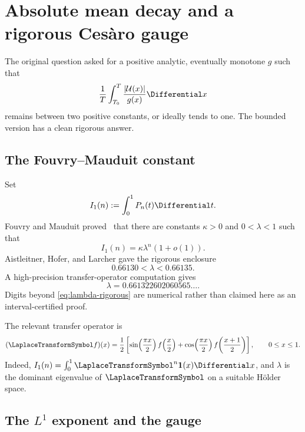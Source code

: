 \documentclass[11pt,oneside]{article}
\theoremstyle{definition}
\theoremstyle{remark}
\newcommand{\Uhat}{\mathcal U}
\begin{document}
\section{Absolute mean decay and a rigorous Ces\`aro gauge}\label{sec:cesaro}

The original question asked for a positive analytic, eventually monotone $g$ such that
\[
 \frac1T\int_{T_0}^{T}\frac{|\Uhat(x)|}{g(x)}\Differential x
\]
remains between two positive constants, or ideally tends to one.  The bounded version
has a clean rigorous answer.

\subsection{The Fouvry--Mauduit constant}

Set
\begin{equation}\label{eq:I1n}
 I_1(n):=\int_0^1P_n(t)\Differential t.
\end{equation}
Fouvry and Mauduit proved~\cite{fouvrymauduit1996} that there are constants
$\kappa>0$ and $0<\lambda<1$ such that
\begin{equation}\label{eq:FM}
 I_1(n)=\kappa\lambda^n(1+o(1)).
\end{equation}
Aistleitner, Hofer, and Larcher gave the rigorous enclosure
\begin{equation}\label{eq:lambda-rigorous}
 0.66130<\lambda<0.66135.
\end{equation}
A high-precision transfer-operator computation gives
\begin{equation}\label{eq:lambda-numeric}
 \lambda=0.661322602060565\ldots .
\end{equation}
Digits beyond \eqref{eq:lambda-rigorous} are numerical rather than claimed here as an
interval-certified proof.

The relevant transfer operator is
\begin{equation}\label{eq:transfer-L1}
 (\LaplaceTransformSymbol f)(x)=\frac12\left[
 \sin\!\left(\frac{\pi x}{2}\right)f\!\left(\frac x2\right)
 +\cos\!\left(\frac{\pi x}{2}\right)f\!\left(\frac{x+1}{2}\right)
 \right],\qquad 0\le x\le1.
\end{equation}
Indeed, $I_1(n)=\int_0^1\LaplaceTransformSymbol^n\mathbf1(x)\Differential x$, and $\lambda$ is the dominant
eigenvalue of $\LaplaceTransformSymbol$ on a suitable H\"older space.

\subsection{The \texorpdfstring{$L^1$}{L1} exponent and the gauge}
\end{document}
